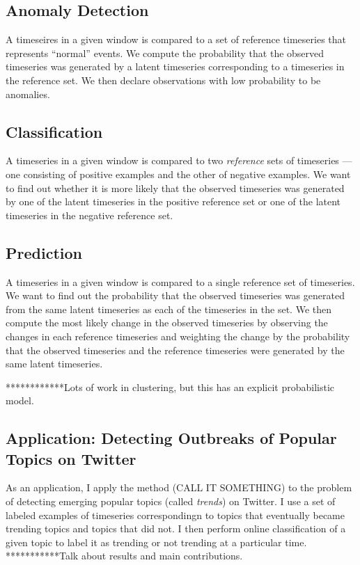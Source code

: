 \subsection{Anomaly Detection}
A timeseires in a given window is compared to a set of reference timeseries that represents ``normal'' events. We compute the probability that the observed timeseries was generated by a latent timeseries corresponding to a timeseries in the reference set. We then declare observations with low probability to be anomalies.

\subsection{Classification}
A timeseries in a given window is compared to two {\em reference} sets of timeseries --- one consisting of positive examples and the other of negative examples. We want to find out whether it is more likely that the observed timeseries was generated by one of the latent timeseries in the positive reference set or one of the latent timeseries in the negative reference set.

\subsection{Prediction} A timeseries in a given window is compared to a single reference set of timeseries. We want to find out the probability that the observed timeseries was generated from the same latent timeseries as each of the timeseries in the set. We then compute the most likely change in the observed timeseries by observing the changes in each reference timeseries and weighting the change by the probability that the observed timeseries and the reference timeseries were generated by the same latent timeseries.
 
************Lots of work in clustering, but this has an explicit probabilistic model.

\subsection{Application: Detecting Outbreaks of Popular Topics on Twitter}
As an application, I apply the method (CALL IT SOMETHING) to the problem of detecting emerging popular topics (called {\em trends}) on Twitter. I use a set of labeled examples of timeseries correspondingn to topics that eventually became trending topics and topics that did not. I then perform online classification of a given topic to label it as trending or not trending at a particular time.
***********Talk about results and main contributions.
